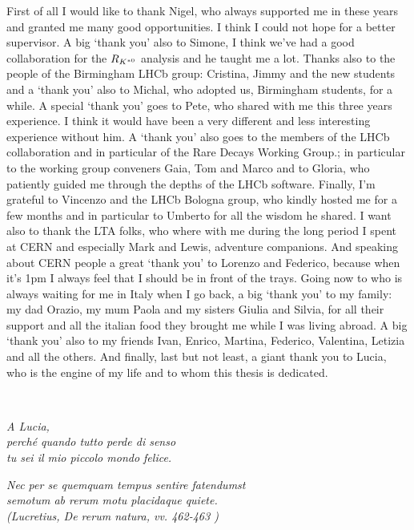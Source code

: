 First of all I would like to thank Nigel, who always supported me in these years and
granted me many good opportunities. I think I could not hope for a better supervisor.
A big `thank you' also to Simone, I think we've had a good collaboration for the $R_{K^{*0}}$ analysis
and he taught me a lot. Thanks also to the people of the Birmingham LHCb group:
Cristina, Jimmy and the new students and a `thank you' also to Michal, who adopted us, Birmingham students, for a while.
A special `thank you' goes to Pete, who shared with me this three years experience.
I think it would have been a very different and less interesting experience without him.
A `thank you' also goes to the members of the LHCb collaboration and in particular of the Rare
Decays Working Group.; in particular to the working group conveners Gaia, Tom and Marco
and to Gloria, who patiently guided me through the depths of the LHCb software.
Finally, I'm grateful to Vincenzo and the LHCb Bologna group, who kindly hosted me
for a few months and in particular to Umberto for all the wisdom he shared. 
I want also to thank the LTA folks, who where with me during the long period I spent at CERN
and especially Mark and Lewis, adventure companions. And speaking about CERN people
a great `thank you' to Lorenzo and Federico, because when it's 1pm I always feel that I should be in front of the trays.
Going now to who is always waiting for me in Italy when I go back, a big `thank you' to my
family: my dad Orazio, my mum Paola and my sisters Giulia and
Silvia, for all their support and all the italian food they brought me while I was living abroad.
A big `thank you' also to my friends Ivan, Enrico, Martina, Federico, Valentina, Letizia
and all the others. And finally, last but not least, a giant thank you to Lucia, who is the engine
of my life and to whom this thesis is dedicated.

\cleardoublepage
~

\begin{flushright}
  \emph{A Lucia, \\
  perch\'{e} quando tutto perde di senso \\
  tu sei il mio piccolo mondo felice.}
  
  \vspace{10cm}
  
   \emph{
   Nec per se quemquam tempus sentire fatendumst \\
   semotum ab rerum motu placidaque quiete. \\
   (Lucretius, De rerum natura, vv. 462-463 )
   } 
\end{flushright}

\cleardoublepage

